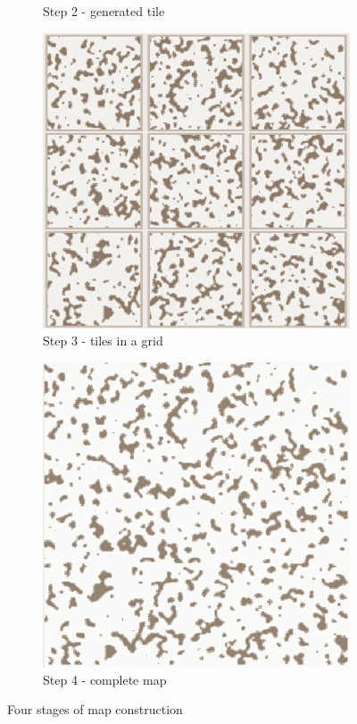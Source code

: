 \documentclass[12pt]{report}
\begin{document}
\begin{figure}[h]
\begin{subfigure}[b]{0.2\textwidth}
		\caption{Step 2 - generated tile} 
	\end{subfigure}
	\hfill
	\begin{subfigure}[b]{0.2\textwidth}
		\centering
		\includegraphics[width=\textwidth]{images/step3}
		\caption{Step 3 - tiles in a grid} 
	\end{subfigure}
	\hfill
	\begin{subfigure}[b]{0.2\textwidth}
		\centering
		\includegraphics[width=\textwidth]{images/step4}
		\caption{Step 4 - complete map} 
	\end{subfigure}
	\caption{Four stages of map construction}
	\label{fig:map_steps}
\end{figure}
\end{document}
